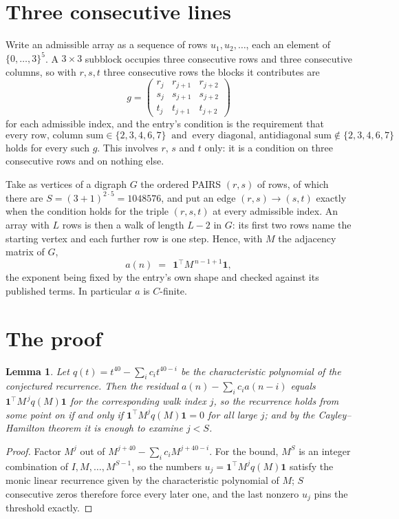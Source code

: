 \documentclass[11pt,a4paper]{article}
\theoremstyle{plain}
\newtheorem{lemma}[theorem]{Lemma}
\theoremstyle{definition}
\begin{document}
\section{Three consecutive lines}

Write an admissible array as a sequence of rows $u_1,u_2,\dots$, each an element of
$\{0,\dots,3\}^{5}$. A $3\times3$ subblock occupies three consecutive rows and
three consecutive columns, so with $r,s,t$ three consecutive rows the blocks it
contributes are
\[
g=\begin{pmatrix}r_j&r_{j+1}&r_{j+2}\\ s_j&s_{j+1}&s_{j+2}\\ t_j&t_{j+1}&t_{j+2}\end{pmatrix}
\]
for each admissible index, and the entry's condition is the requirement that
\[
\text{every row, column sum} \in \{2,3,4,6,7\}\ \text{ and }\ \text{every diagonal, antidiagonal sum} \notin \{2,3,4,6,7\}
\]
holds for every such $g$. This involves $r$, $s$ and $t$ only: it is a condition on
three consecutive rows and on nothing else.

Take as vertices of a digraph $G$ the ordered PAIRS $(r,s)$ of rows, of which there are
$S=(3+1)^{2\cdot5}=1048576$, and put an edge $(r,s)\to(s,t)$ exactly when the condition
holds for the triple $(r,s,t)$ at every admissible index. An array with $L$ rows is then a
walk of length $L-2$ in $G$: its first two rows name the starting vertex and each further
row is one step. Hence, with $M$ the adjacency matrix of $G$,
\[
a(n)\;=\;\,\mathbf{1}^{\!\top}M^{\,n-1+1}\mathbf{1},
\]
the exponent being fixed by the entry's own shape and checked against its published terms.
In particular $a$ is $C$-finite.

\section{The proof}

\begin{lemma}\label{lem:crit}
Let $q(t)=t^{40}-\sum_i c_it^{40-i}$ be the characteristic polynomial of the
conjectured recurrence. Then the residual $a(n)-\sum_ic_ia(n-i)$ equals
$\mathbf{1}^{\!\top}M^{\,j}q(M)\mathbf{1}$ for the corresponding walk index
$j$, so the recurrence holds from some point on if and only if
$\mathbf{1}^{\!\top}M^{j}q(M)\mathbf{1}=0$ for all large $j$; and by the
Cayley--Hamilton theorem it is enough to examine $j<S$.
\end{lemma}

\begin{proof}
Factor $M^{j}$ out of $M^{j+40}-\sum_ic_iM^{j+40-i}$. For the bound, $M^{S}$
is an integer combination of $I,M,\dots,M^{S-1}$, so the numbers
$u_j=\mathbf{1}^{\!\top}M^{j}q(M)\mathbf{1}$ satisfy the monic linear recurrence given by
the characteristic polynomial of $M$; $S$ consecutive zeros therefore force every later one,
and the last nonzero $u_j$ pins the threshold exactly.
\end{proof}
\end{document}
